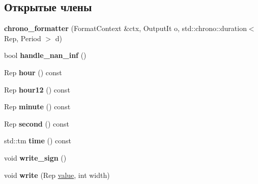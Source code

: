 \subsection*{Открытые члены}
\begin{DoxyCompactItemize}
\item 
\mbox{\label{structinternal_1_1chrono__formatter_a55af30f2aea49dc895ae838b4aca5419}} 
{\bfseries chrono\+\_\+formatter} (Format\+Context \&ctx, Output\+It o, std\+::chrono\+::duration$<$ Rep, Period $>$ d)
\item 
\mbox{\label{structinternal_1_1chrono__formatter_a944612c1e2f326456dbf58450730a9cd}} 
bool {\bfseries handle\+\_\+nan\+\_\+inf} ()
\item 
\mbox{\label{structinternal_1_1chrono__formatter_a493a7da3effd57445d8f30a836dae62b}} 
Rep {\bfseries hour} () const
\item 
\mbox{\label{structinternal_1_1chrono__formatter_ac88e9a05d649c871711fa44e74d6f381}} 
Rep {\bfseries hour12} () const
\item 
\mbox{\label{structinternal_1_1chrono__formatter_a3da339b84345f3387d7a3576fe9a947a}} 
Rep {\bfseries minute} () const
\item 
\mbox{\label{structinternal_1_1chrono__formatter_a284556b16bf61863e1e09e37f605c9ba}} 
Rep {\bfseries second} () const
\item 
\mbox{\label{structinternal_1_1chrono__formatter_a6db7bd9594c704d8820efe85e0efea3c}} 
std\+::tm {\bfseries time} () const
\item 
\mbox{\label{structinternal_1_1chrono__formatter_a90e6f92821c52c30ca912cc6ccc2e5ba}} 
void {\bfseries write\+\_\+sign} ()
\item 
\mbox{\label{structinternal_1_1chrono__formatter_ac794f6fadb1f9ca1db842f065b27e347}} 
void {\bfseries write} (Rep \hyperlink{classinternal_1_1value}{value}, int width)

\end{DoxyCompactItemize}
